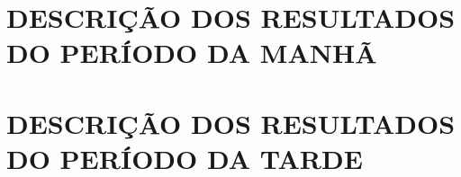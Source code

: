 \chapter{DESCRIÇÃO DOS RESULTADOS DO PERÍODO DA MANHÃ}





\newpage 
\chapter{DESCRIÇÃO DOS RESULTADOS DO PERÍODO DA TARDE}





\newpage 
